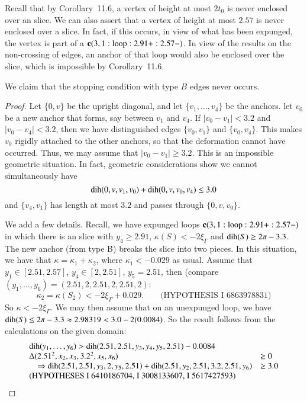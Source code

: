Recall that by Corollary~11.6, a vertex of height at most $2t_0$ is
never enclosed over an slice.  We can also assert that
a vertex of height at most $2.57$ is never enclosed over a slice.
  In fact, if this occurs, in view of what has been expunged,
the vertex is part of a ${\operatorname{\bf c}}{(3,1:{\operatorname{loop}}:2.91+:2.57-)}$.  In view of the results on the non-crossing
of edges, an anchor of that loop  would also be enclosed over the
slice, which is impossible by Corollary~11.6.

\begin{lemma}
We claim that the stopping condition with type
$B$ edges never occurs.
\end{lemma}

\begin{proof}
Let $\{0,v\}$ be the upright diagonal, and let $\{v_1,\ldots,v_4\}$ be the anchors.  let $v_0$ be a new anchor that forms, say between $v_1$ and $v_4$.  If $|v_0-v_1|< 3.2$ and $|v_0-v_4|<3.2$, then we have distinguished edges $\{v_0,v_1\}$ and $\{v_0,v_4\}$.  This makes $v_0$ rigidly attached to the other anchors, so that the deformation cannot have occurred.  Thus, we may assume that $|v_0-v_1|\ge 3.2$.  This is an impossible geometric situation.  In fact, geometric considerations show we cannot simultaneously have
  $$
  {\operatorname{dih}}(0,v,v_1,v_0) + {\operatorname{dih}}(0,v,v_0,v_4)\le 3.0
  $$
and $\{v_4,v_1\}$ has length at most $3.2$ and passes through $\{0,v,v_0\}$.  

We add a few details.  Recall, we have expunged loops ${\operatorname{\bf c}}{(3,1:{\operatorname{loop}}:2.91+:2.57-)}$ in which there is an slice with $y_4\ge 2.91$, $\kappa(S)<-2\xi_\Gamma$ and ${\operatorname{dih}}(S)\ge 2\pi-3.3$.  The new anchor (from type B) breaks the slice into two
pieces.  
In this situation, we have that $\kappa = \kappa_1 + \kappa_2$, where $\kappa_1 < -0.029$ as usual.  Assume that
$y_1\in[2.51,2.57]$, $y_4\in[2,2.51]$, $y_5=2.51$, then (compare $(y_1,\ldots,y_6) = (2.51,2,2.51,2,2.51,2)$: 
   $$\kappa_2 =\kappa(S_2) < -2\xi_\Gamma + 0.029.\qquad 
      \text{(HYPOTHESIS I 6863978831)}$$
So $\kappa < -2\xi_\Gamma$.  We may then assume that on an unexpunged
loop, we have ${\operatorname{dih}}(S)\le 2\pi-3.3\approx 2.98319 < 3.0 - 2(0.0084)$.
So the result follows from the calculations on the given domain:
    $$
    \begin{array}{lllll}
    {\operatorname{dih}}(y_1,\ldots,y_6) > {\operatorname{dih}}(2.51,2.51,y_3,y_4,y_5,2.51) - 0.0084&\\
    \Delta(2.51^2,x_2,x_3,3.2^2,x_5,x_6) &\ge 0 \\ \quad \Rightarrow 
    {\operatorname{dih}}(2.51,2.51,y_3,2,y_5,2.51) + {\operatorname{dih}}(2.51,y_2,2.51,3.2,2.51,y_6) &\ge 3.0\\
    \text{(HYPOTHESES I 6410186704, I 3008133607, I 5617427593)}
    \end{array} 
    $$
\end{proof}

